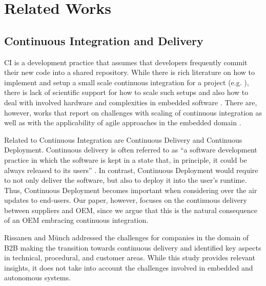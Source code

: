\section{Related Works}\label{sec:relatedWorks}


\subsection{Continuous Integration and Delivery}

CI %
is a development practice that assumes that developers frequently commit their new code into a shared repository. 
While there is %
rich literature on how to implement and setup a small scale continuous integration for a project (e.g. \cite{Fowler2006,Neely2013}), there is lack of scientific support for how to scale such setups and also how to deal with involved hardware and complexities in embedded software \cite{Debbiche2014}. There are, however, works that report on challenges with scaling of continuous integration \cite{Roberts2004,Rogers2004} as well as with the applicability of agile approaches in the embedded domain \cite{Eklund2012a}.

Related to Continuous Integration are Continuous Delivery and Continuous Deployment.
Continuous delivery is often referred to as ``a software development practice in which the software is kept in a state that, in principle, it could be always released to its users'' \cite{Humble2010}. 
In contrast, Continuous Deployment would require to not only deliver the software, but also to deploy it into the user's runtime.
Thus, Continuous Deployment becomes important when considering over the air updates to end-users.
Our paper, however, focuses on the continuous delivery between suppliers and OEM, since we argue that this is the natural consequence of an OEM embracing  continuous integration.

Rissanen and M\"unch \cite{Rissanen2015} addressed the challenges for companies in the domain of B2B making the transition towards continuous delivery and identified key aspects in technical, procedural, and customer areas. While this study provides relevant insights, it does not take into account the challenges involved in embedded and autonomous systems. 


